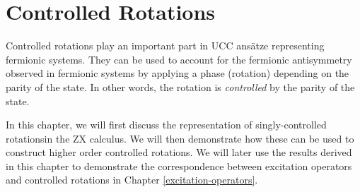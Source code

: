 \chapter{Controlled Rotations}%
\label{controlled-rotations}

Controlled rotations play an important part in UCC ansätze representing fermionic systems. They can be used to account for the fermionic antisymmetry observed in fermionic systems by applying a phase (rotation) depending on the parity of the state. In other words, the rotation is \textit{controlled} by the parity of the state.

In this chapter, we will first discuss the representation of singly-controlled rotationsin the ZX calculus. We will then demonstrate how these can be used to construct higher order controlled rotations. We will later use the results derived in this chapter to demonstrate the correspondence between excitation operators and controlled rotations in Chapter \ref{excitation-operators}.
